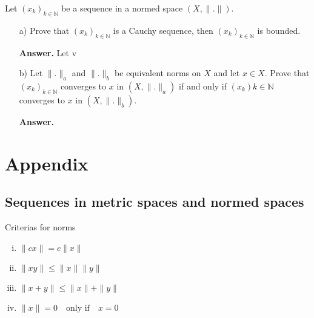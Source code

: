 \documentclass{article}
\theoremstyle{remark}
\begin{document}
Let $\left( x_{k} \right)_{k \in \mathbb{N}} $ be a sequence in a normed space $\left( X, \|.\| \right) $. 

\begin{enumerate}
  \item[a)] Prove that $\left( x_{k} \right)_{k \in \mathbb{N}}$ is a Cauchy sequence, then $\left( x_{k} \right)_{k \in \mathbb{N}}$ is bounded. 
      \par
      \begin{tcolorbox}
        \textbf{Answer.} 
        Let  v

      \end{tcolorbox}

    \item[b)]  Let $\|.\|_{a}$ and $\|.\|_{b}$ be equivalent norms on $X$ and let $x \in X$. Prove that  $\left( x_{k} \right)_{k \in \mathbb{N}}$ converges to $x$ in $\left( X, \|.\|_a \right)$ if and only if $\left( x_{k} \right)k \in \mathbb{N}$ converges to $x$ in $\left( X, \|.\|_{b} \right)$.
      \begin{tcolorbox}
        \textbf{Answer.} 
      \end{tcolorbox}



\end{enumerate}


\newpage
\section{Appendix}%
\label{sec:Notes}

\subsection{Sequences in metric spaces and normed spaces}%
\label{sub:sequences_in_metric_spaces_and_normed_spaces}

\begin{definition}[Norm]
  Criterias for norms
  \begin{enumerate}[(i)]
    \item $\|cx\| = c\|x\|$
    \item $\|xy\| \le \|x\| \|y\|$
    \item $\|x + y\| \le \|x\| +  \|y\|$
    \item $\|x\| = 0 \quad \text{only if} \quad x = 0 $ 
  \end{enumerate}

\end{definition}
\end{document}
